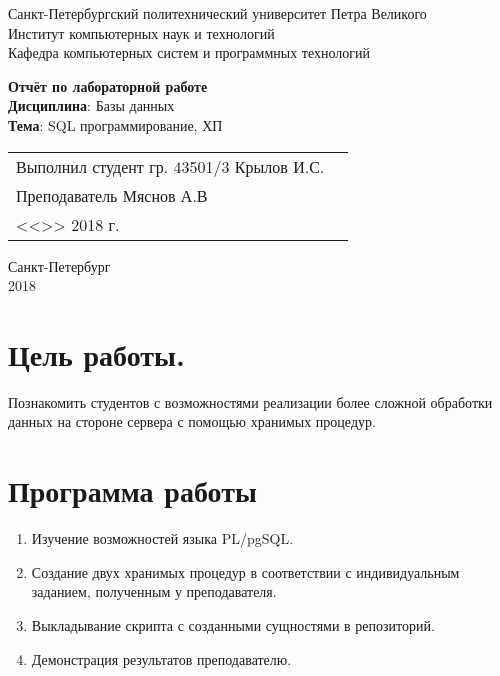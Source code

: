 \documentclass[a4paper,14pt]{extarticle}
\begin{document}
\begin{titlepage}
\centering
Санкт-Петербургский политехнический университет Петра Великого \\
Институт компьютерных наук и технологий \\
Кафедра компьютерных систем и программных технологий \\
\vspace{5.5cm}

{\centering \textbf{Отчёт по лабораторной работе} \\ 
\vspace{0.15cm}
\textbf{Дисциплина}: Базы данных \\
\vspace{0.15cm}
\textbf{Тема}: SQL программирование, ХП} \\

\vspace{5.5cm}

\begin{table}[H]
\begin{tabular}{p{\textwidth}@{}r}
{Выполнил студент гр. 43501/3} \hfill 
\vspace{0.2cm}
Крылов И.С. \\ \hfill
\vspace{0.2cm}

Преподаватель \hfill 
\vspace{0.2cm}
Мяснов А.В \\ \hfill 
\vspace{0.2cm}

{} \hfill { <<\underline{\hspace{0.08\textwidth}}>> \underline{\hspace{0.2\textwidth}}2018 г.} \\
\end{tabular}
\end{table}
\vfill
{\centering Санкт-Петербург \\ 
\vspace{0.15cm}
2018}
\end{titlepage}

\section{Цель работы.}
Познакомить студентов с возможностями реализации более сложной обработки данных на стороне сервера с помощью хранимых процедур.

\section{Программа работы}
\begin{enumerate}
\item Изучение возможностей языка PL/pgSQL.
\item Создание двух хранимых процедур в соответствии с индивидуальным заданием, полученным у преподавателя.
\item Выкладывание скрипта с созданными сущностями в репозиторий.
\item Демонстрация результатов преподавателю.
\end{enumerate}
\end{document}
